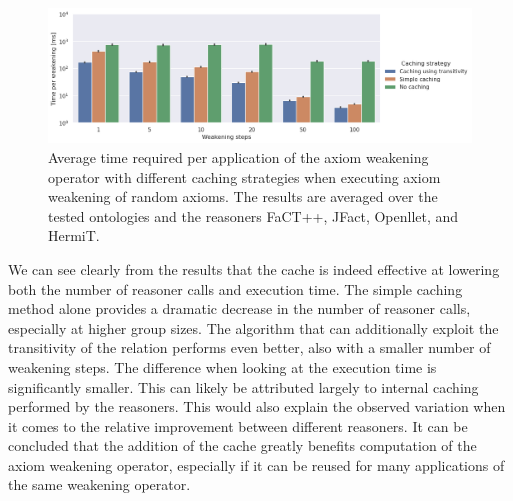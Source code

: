 \begin{figure}[ht]
  \centering
  \includegraphics[width=\textwidth]{resources/time-cache-bar.png}
  \caption{Average time required per application of the axiom weakening operator with different caching strategies when executing axiom weakening of random axioms. The results are averaged over the tested ontologies and the reasoners FaCT++, JFact, Openllet, and HermiT.}
  \label{fig:results-cache-time}
\end{figure}

We can see clearly from the results that the cache is indeed effective at lowering both the number of reasoner calls and execution time. The simple caching method alone provides a dramatic decrease in the number of reasoner calls, especially at higher group sizes. The algorithm that can additionally exploit the transitivity of the relation performs even better, also with a smaller number of weakening steps. The difference when looking at the execution time is significantly smaller. This can likely be attributed largely to internal caching performed by the reasoners. This would also explain the observed variation when it comes to the relative improvement between different reasoners. It can be concluded that the addition of the cache greatly benefits computation of the axiom weakening operator, especially if it can be reused for many applications of the same weakening operator.

